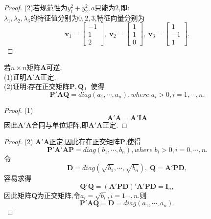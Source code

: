 \documentclass[lang=cn,11pt,normal]{elegantbook}
\renewcommand{\AA}{\boldsymbol{A}}
\newcommand{\DD}{\boldsymbol{D}}
\newcommand{\II}{\boldsymbol{I}}
\newcommand{\PP}{\boldsymbol{P}}
\newcommand{\QQ}{\boldsymbol{Q}}
\begin{document}
	\begin{proof}
		(2)若规范性为$y_1^2+y_2^2,a$只能为$2$,即:\\
		$\lambda_1,\lambda_2,\lambda_3$的特征值分别为$0,2,3$,特征向量分别为
		\begin{equation}
		\boldsymbol{v}_1=\begin{bmatrix}-1\\1\\2\end{bmatrix},\;\boldsymbol{v}_2=\begin{bmatrix}1\\1\\0\end{bmatrix},\;\boldsymbol{v}_3=\begin{bmatrix}1\\-1\\1\end{bmatrix}.
		\end{equation}
	\end{proof}
	\begin{exercise}
		若$n\times n$矩阵$\AA$可逆,\\
		(1)证明$\AA'\AA$正定.\\
		(2)证明:存在正交矩阵$\PP,\QQ$，使得
		\begin{equation}
		\PP'\boldsymbol{AQ}=diag\left(a_1,\cdots,a_n\right),where \; a_i>0,i=1,\cdots,n.
		\end{equation}
	\end{exercise}
	\begin{proof}
		(1)
		\begin{equation}
		\AA'\AA=\AA'\boldsymbol{IA}
		\end{equation}
		因此$\AA'\AA$合同与单位矩阵,即$\AA'\AA$正定.
	\end{proof}
	\begin{proof}
		(2)
		$\AA'\AA$正定,因此存在正交矩阵$\PP$,使得
		\begin{equation}
		\PP'\AA'\boldsymbol{AP}=diag(b_1,\cdots,b_n),where\;b_i>0,i=0,\cdots,n.
		\end{equation}
		令
		\begin{equation}
		\DD=diag\left(\sqrt{b_1},\cdots,\sqrt{b_n}\right),\;\QQ=\AA'\boldsymbol{PD},
		\end{equation}
		容易求得
		\begin{equation}
		\QQ'\QQ=(\AA'\boldsymbol{PD})'\AA'\boldsymbol{PD}=\II_n,
		\end{equation}
		因此矩阵$\QQ$为正交矩阵,令$a_i=\sqrt{b_i},i=1\cdots,n.$则
		\begin{equation}
		\PP'\boldsymbol{AQ}=\DD=diag\left(a_1,\cdots,a_n\right).
		\end{equation}
	\end{proof}
\end{document}
